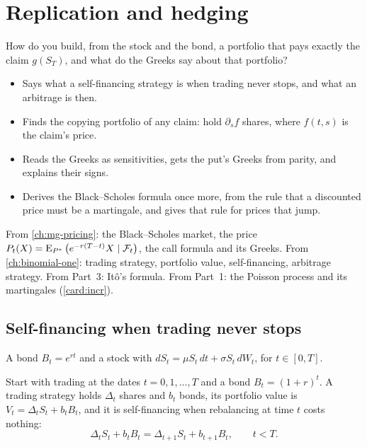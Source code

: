 \chapter{Replication and hedging}
\label{ch:replication}

\begin{question}
How do you build, from the stock and the bond, a portfolio that pays exactly the claim $g(S_T)$, and what do the Greeks say about that portfolio?
\end{question}

\begin{whatfor}
\begin{itemize}
  \item Says what a self-financing strategy is when trading never stops, and what an arbitrage is then.
  \item Finds the copying portfolio of any claim: hold $\partial_sf$ shares, where $f(t,s)$ is the claim's price.
  \item Reads the Greeks as sensitivities, gets the put's Greeks from parity, and explains their signs.
  \item Derives the Black--Scholes formula once more, from the rule that a discounted price must be a martingale, and gives that rule for prices that jump.
\end{itemize}
\end{whatfor}

\begin{prereq}
From \cref{ch:mg-pricing}: the Black--Scholes market, the price $P_t(X)=\operatorname{E}_{P^*}\big(e^{-r(T-t)}X\mid\mathcal F_t\big)$, the call formula and its Greeks. From \cref{ch:binomial-one}: trading strategy, portfolio value, self-financing, arbitrage strategy. From Part~3: Itô's formula. From Part~1: the Poisson process and its martingales (\cref{card:incr}).
\end{prereq}

\section{Self-financing when trading never stops}

\begin{setup}
A bond $B_t=e^{rt}$ and a stock with $dS_t=\mu S_t\,dt+\sigma S_t\,dW_t$, for $t\in[0,T]$.
\end{setup}

Start with trading at the dates $t=0,1,\dots,T$ and a bond $B_t=(1+r)^t$. A trading strategy holds $\Delta_t$ shares and $b_t$ bonds, its portfolio value is $V_t=\Delta_tS_t+b_tB_t$, and it is self-financing when rebalancing at time $t$ costs nothing:
\[
  \Delta_tS_t+b_tB_t=\Delta_{t+1}S_t+b_{t+1}B_t,\qquad t<T.
\]

